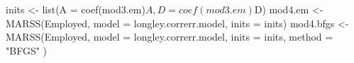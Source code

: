 \begin{Schunk}
\begin{Sinput}
 inits <- list(A = coef(mod3.em)$A, D = coef(mod3.em)$D)
 mod4.em <- MARSS(Employed, model = longley.correrr.model, inits = inits)
 mod4.bfgs <- MARSS(Employed,
   model = longley.correrr.model,
   inits = inits, method = "BFGS"
 )
\end{Sinput}
\end{Schunk}

